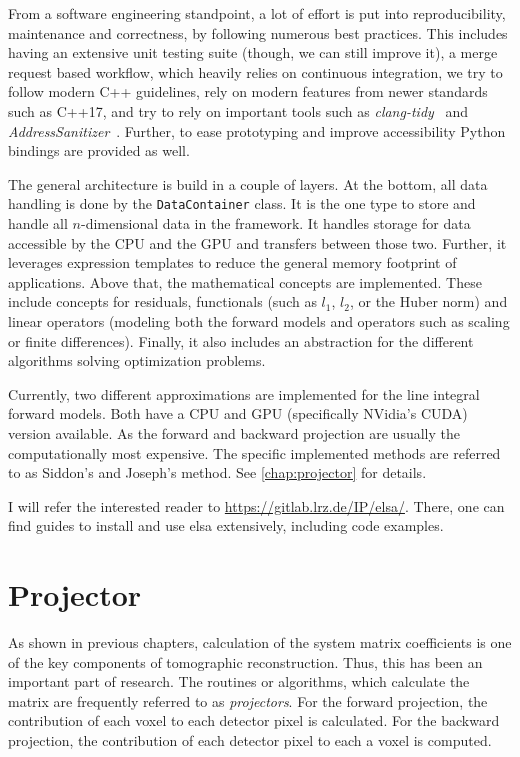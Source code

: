 From a software engineering standpoint, a lot of effort is put into reproducibility, maintenance and
correctness, by following numerous best practices. This includes having an extensive unit testing
suite (though, we can still improve it), a merge request based workflow, which heavily relies on
continuous integration, we try to follow modern C++ guidelines, rely on modern features from newer
standards such as C++17, and try to rely on important tools such as
\textit{clang-tidy}~\cite{noauthor_clang-tidy_nodate} and
\textit{AddressSanitizer}~\cite{noauthor_addresssanitizer_2021}. Further, to ease prototyping and
improve accessibility Python bindings are provided as well.

The general architecture is build in a couple of layers. At the bottom, all data handling is done by
the \texttt{DataContainer} class. It is the one type to store and handle all
\(n\)-dimensional data in the framework. It handles storage for data accessible by the \gls{CPU} and
the \gls{GPU} and transfers between those two. Further, it leverages expression templates to reduce
the general memory footprint of applications. Above that, the mathematical concepts are implemented.
These include concepts for residuals, functionals (such as \(l_1\), \(l_2\), or the Huber norm) and
linear operators (modeling both the forward models and operators such as scaling or finite
differences). Finally, it also includes an abstraction for the different algorithms solving
optimization problems.

Currently, two different approximations are implemented for the line integral forward models. Both
have a \gls{CPU} and \gls{GPU} (specifically NVidia's CUDA) version available. As the forward and
backward projection are usually the computationally most expensive. The specific implemented methods
are referred to as Siddon's and Joseph's method. See \autoref{chap:projector} for details.

I will refer the interested reader to
\href{https://gitlab.lrz.de/IP/elsa/}{https://gitlab.lrz.de/IP/elsa/}. There, one can find guides to
install and use elsa extensively, including code examples.

\chapter{Projector}\label{chap:projector}

As shown in previous chapters, calculation of the system matrix coefficients is one of the key
components of tomographic reconstruction. Thus, this has been an important part of research. The
routines or algorithms, which calculate the matrix are frequently referred to as
\textit{projectors}. For the forward projection, the contribution of each voxel to each detector
pixel is calculated. For the backward projection, the contribution of each detector pixel to each a
voxel is computed.

